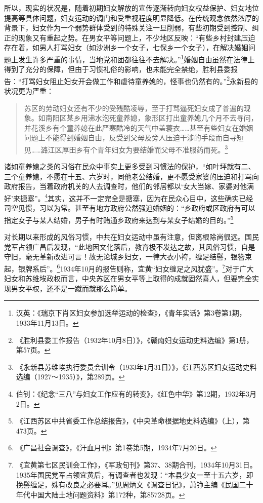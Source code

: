 所以，现实的状况是，随着初期妇女解放的宣传逐渐转向妇女权益保护、妇女地位提高等具体问题，妇女运动的调门和受重视程度明显降低。在传统观念依然浓厚的背景下，妇女作为一个弱势群体受到的特殊关注一旦削弱，有些初期受到控制、纠正的现象又有重起之势。在男女平等问题上，不少地区反映：“有些乡村封建压迫存在着，如男人打骂妇女（如沙洲乡一个女子，七保乡一个女子），在解决婚姻问题上发生许多严重的事情，当地党和团都往往不去解决。”\footnote{汉英：《瑞京下肖区妇女参加选举运动的检查》，《青年实话》第3卷第1期，1933年11月13日。}婚姻自由虽然在法律上得到了充分的保障，但由于习惯礼俗的影响，也未能完全禁绝，胜利县委报告：“打骂妇女阻止妇女开会做工作和虐待童养媳的，怪事也仍然有的。”\footnote{《胜利县委工作报告（1932年10月8日）》，《赣南妇女运动史料选编》第1册，第57页。}永新县的状况更为严重：

\begin{quote}

苏区的劳动妇女还有不少的受残酷凌辱，至于打骂逼死妇女成了普遍的现象。如南阳区某乡用沸水泡死童养媳，象形区打出童养媳几个月不去寻问，并花溪乡有个童养媳在此严寒酷冷的天气中盖蓑衣……甚至有些妇女在婚姻问题上不能得到婚姻自由，反受到父母及旁人压迫干涉的手段而自寻短见……潞江区厚田乡有个青年妇女为要结婚而父母不准服药而死。\footnote{《永新县苏维埃执行委员会训令（1933年1月31日）》，《江西苏区妇女运动史料选编（1927～1935）》，第289页。}
\end{quote}


诸如童养媳之类的习俗在民众中事实上更多受到习惯法的保护，“如叶坪就有二、三个童养媳，不愿在十五、六岁时，同他老公结婚，更不愿受家婆的压迫和打骂向政府报告，当着政府机关的人去调查时，他们的邻居都以‘女大当嫁、家婆对他满好’来搪塞”。\footnote{伯钊：《纪念“三八”与妇女工作应有的转变》，《红色中华》第12期，1932年3月2日。}其实，这并不一定完全是搪塞，因为在民众心目中，这些确实已经司空见惯，习以为常。甚至有地方政府公然强迫婚姻的：“乡政府或区政府有可以指定女子与某人结婚，男子有时贿通乡政府来达到与某女子结婚的目的。”\footnote{《江西苏区中共省委工作总结报告》，《中央革命根据地史料选编》（上），第473页。}


对长期以来形成的风俗习惯，中共在妇女运动中虽有注意，但离根除尚很远。国民党军占领广昌后发现，“此地因文化落后，教育极不发达之故，其风俗习惯，自是守旧，毫无革新改进可言！故无论城乡妇女，一律大衣小袴，缠足结髻，银簪束起，银牌系后”。\footnote{《广昌社会调查》，《汗血月刊》第1卷第5期，1934年7月20日。}1934年10月的报告则称，宜黄“妇女缠足之风犹盛”。\footnote{《宜黄第七区民训会工作》，《军政旬刊》第37、38期合刊，1934年10月31日。1935年国民党军占领宜黄后，有调查者也发现：“本县少女一至十五六岁，即挽髻缠足，殊有改良之必要耳。”见周炳文《调查日记》，萧铮主编《民国二十年代中国大陆土地问题资料》第172种，第85728页。}对于广大妇女和苏维埃政权而言，中央苏区在男女平等上取得的成就固然喜人，但要完全实现男女平权，还不是一蹴而就那么简单。


